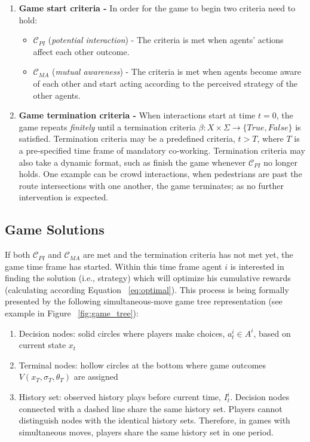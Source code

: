 \documentclass[letterpaper, 10 pt, conference]{ieeeconf}  %
\begin{document}
\begin{enumerate}
	\item \textbf{Game start criteria -} In order for the game to begin two criteria need to hold:
	\begin{itemize}
		\item $\mathcal{C}_{PI}$ (\textit{potential interaction}) - The criteria is met when agents' actions affect each other outcome.
		\item $\mathcal{C}_{MA}$ (\textit{mutual awareness}) - The criteria is met when agents become aware of each other and start acting according to the perceived strategy of the other agents.
	\end{itemize} 
	\item \textbf{Game termination criteria -} When interactions start at time $t=0$, the game repeats \textit{finitely} until a termination criteria $\beta: X \times \Sigma \rightarrow \{True,False\}$ is satisfied. Termination criteria may be a predefined criteria, $t>T$, where $T$ is a pre-specified time frame of mandatory co-working. Termination criteria may also take a dynamic format, such as finish the game whenever $\mathcal{C}_{PI}$ no longer holds. One example can be crowd interactions, when pedestrians are past the route intersections with one another, the game terminates; as no further intervention is expected.
\end{enumerate}


\subsection{Game Solutions}
If both $\mathcal{C}_{PI}$ and $\mathcal{C}_{MA}$ are met and the termination criteria has not met yet, the game time frame has started. Within this time frame agent $i$ is interested in finding the solution (i.e., strategy) which will optimize his cumulative rewards (calculating according Equation ~\ref{eq:optimal}). This process is being formally presented by the following simultaneous-move game tree representation (see example in Figure ~\ref{fig:game_tree}):
\begin{enumerate}
  \item Decision nodes: solid circles where players make choices, 
    $a^i_t \in A^i$, based on current state $x_t$
  \item Terminal nodes: hollow circles at the bottom where game outcomes 
    $V(x_T,\sigma_T,\theta_T)$ are assigned
  \item History set: observed history plays before current time, $I^i_t$. 
    Decision nodes connected with a dashed line share the same history 
    set. Players cannot distinguish nodes with the identical history sets. Therefore, in games with simultaneous moves, players share the same history set in one period.  
\end{enumerate}
\end{document}
